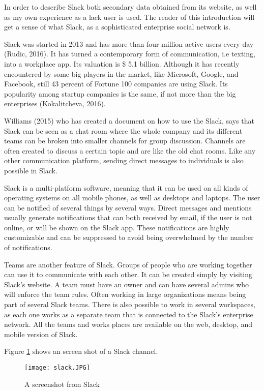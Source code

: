 In order to describe Slack both secondary data obtained from its website, as well as my own experience as a lack user is used. The reader of this introduction will get a sense of what Slack, as a sophisticated enterprise social network is.

Slack was started in 2013 and has more than four million active users every day (Rudic, 2016). It has turned a contemporary form of communication, i.e texting, into a workplace app. Its valuation is \$ 5.1 billion. Although it has recently encountered by some big players in the market, like Microsoft, Google, and Facebook, still 43 percent of Fortune 100 companies are using Slack. Its popularity among startup companies is the same, if not more than the big enterprises (Kokalitcheva, 2016).

Williams (2015) who has created a document on how to use the Slack, says that Slack can be seen as a chat room where the whole company and its different teams can be broken into smaller channels for group discussion. Channels are often created to discuss a certain topic and are like the old chat rooms. Like any other communication platform, sending direct messages to individuals is also possible in Slack.

Slack is a multi-platform software, meaning that it can be used on all kinds of operating systems on all mobile phones, as well as desktops and laptops. The user can be notified of several things by several ways. Direct messages and mentions usually generate notifications that can both received by email, if the user is not online, or will be shown on the Slack app. These notifications are highly customizable and can be suppressed to avoid being overwhelmed by the number of notifications. 

Teams are another feature of Slack. Groups of people who are working together can use it to communicate with each other. It can be created simply by visiting Slack's website. A team must have an owner and can have several admins who will enforce the team rules. Often working in large organizations means being part of several Slack teams. There is also possible to work in several workspaces, as each one works as a separate team that is connected to the Slack's enterprise network.  All the teams and works places are available on the web, desktop, and mobile version of Slack.

Figure \ref{fig:slack} shows an screen shot of a Slack channel.
\begin{figure}[hbt!]
\centering
\texttt{[image: slack.JPG]}
\caption{A screenshot from Slack}\label{fig:slack}
\end{figure}


